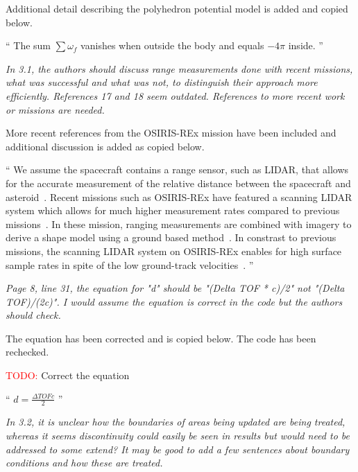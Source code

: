 \documentclass[11pt]{article}
\newcommand{\todo}{{\large \textcolor{red}{TODO: }}}
\newenvironment{correction}{\begin{list}{}{\setlength{\leftmargin}{1cm}\setlength{\rightmargin}{1cm}}\vspace{\parsep}\item[]``}{''\end{list}}
\newcommand{\comment}[1]{\item \itshape #1 \normalfont}
\begin{document}
\begin{itemize}
Additional detail describing the polyhedron potential model is added and copied below.

\begin{correction}
    The sum \( \sum \omega_f \) vanishes when outside the body and equals \( -4 \pi \) inside.
\end{correction}

\comment{
In 3.1, the authors should discuss range measurements done with recent missions, what was successful and what was not, to distinguish their approach more efficiently. 
References 17 and 18 seem outdated. 
References to more recent work or missions are needed.
}

More recent references from the OSIRIS-REx mission have been included and additional discussion is added as copied below.

\begin{correction}
We assume the spacecraft contains a range sensor, such as LIDAR, that allows for the accurate measurement of the relative distance between the spacecraft and asteroid~\cite{zuber1997,zuber2000}.
Recent missions such as OSIRIS-REx have featured a scanning LIDAR system which allows for much higher measurement rates compared to previous missions~\cite{lauretta2017,daly2017}.
In these mission, ranging measurements are combined with imagery to derive a shape model using a ground based method~\cite{gaskell2008}.
In constrast to previous missions, the scanning LIDAR system on OSIRIS-REx enables for high surface sample rates in spite of the low ground-track velocities~\cite{daly2017}.
\end{correction}

\comment{
Page 8, line 31, the equation for "d" should be "(Delta TOF * c)/2" not "(Delta TOF)/(2c)". I would assume the equation is correct in the code but the authors should check.
}

The equation has been corrected and is copied below.
The code has been rechecked. 

\todo Correct the equation

\begin{correction}
    \(d = \frac{\Delta TOF c}{2} \) 
\end{correction}

\comment{
In 3.2, it is unclear how the boundaries of areas being updated are being treated, whereas it seems discontinuity could easily be seen in results but would need to be addressed to some extend? 
It may be good to add a few sentences about boundary conditions and how these are treated.
}


\end{itemize}
\end{document}
